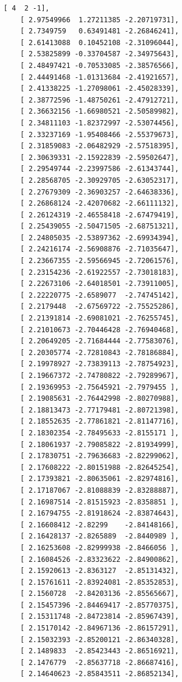 \documentclass[11pt]{article}
\begin{document}
    \begin{Verbatim}[commandchars=\\\{\}]
    [ 4  2 -1],
    [ 2.97549966  1.27211385 -2.20719731],
    [ 2.7349759   0.63491481 -2.26846241],
    [ 2.61413088  0.10452108 -2.31096044],
    [ 2.53825899 -0.33704587 -2.34975643],
    [ 2.48497421 -0.70533085 -2.38576566],
    [ 2.44491468 -1.01313684 -2.41921657],
    [ 2.41338225 -1.27098061 -2.45028339],
    [ 2.38772596 -1.48750261 -2.47912721],
    [ 2.36632156 -1.66980521 -2.50589982],
    [ 2.34811103 -1.82372997 -2.53074456],
    [ 2.33237169 -1.95408466 -2.55379673],
    [ 2.31859083 -2.06482929 -2.57518395],
    [ 2.30639331 -2.15922839 -2.59502647],
    [ 2.29549744 -2.23997586 -2.61343744],
    [ 2.28568705 -2.30929705 -2.63052317],
    [ 2.27679309 -2.36903257 -2.64638336],
    [ 2.26868124 -2.42070682 -2.66111132],
    [ 2.26124319 -2.46558418 -2.67479419],
    [ 2.25439055 -2.50471505 -2.68751321],
    [ 2.24805035 -2.53897362 -2.69934394],
    [ 2.24216174 -2.56908876 -2.71035647],
    [ 2.23667355 -2.59566945 -2.72061576],
    [ 2.23154236 -2.61922557 -2.73018183],
    [ 2.22673106 -2.64018501 -2.73911005],
    [ 2.22220775 -2.6589077  -2.74745142],
    [ 2.2179448  -2.67569722 -2.75525286],
    [ 2.21391814 -2.69081021 -2.76255745],
    [ 2.21010673 -2.70446428 -2.76940468],
    [ 2.20649205 -2.71684444 -2.77583076],
    [ 2.20305774 -2.72810843 -2.78186884],
    [ 2.19978927 -2.73839113 -2.78754923],
    [ 2.19667372 -2.74780822 -2.79289967],
    [ 2.19369953 -2.75645921 -2.7979455 ],
    [ 2.19085631 -2.76442998 -2.80270988],
    [ 2.18813473 -2.77179481 -2.80721398],
    [ 2.18552635 -2.77861821 -2.81147716],
    [ 2.18302354 -2.78495633 -2.8155171 ],
    [ 2.18061937 -2.79085822 -2.81934999],
    [ 2.17830751 -2.79636683 -2.82299062],
    [ 2.17608222 -2.80151988 -2.82645254],
    [ 2.17393821 -2.80635061 -2.82974816],
    [ 2.17187067 -2.81088839 -2.83288887],
    [ 2.16987514 -2.81515923 -2.8358851 ],
    [ 2.16794755 -2.81918624 -2.83874643],
    [ 2.16608412 -2.82299    -2.84148166],
    [ 2.16428137 -2.8265889  -2.8440989 ],
    [ 2.16253608 -2.82999938 -2.8466056 ],
    [ 2.16084526 -2.83323622 -2.84900862],
    [ 2.15920613 -2.8363127  -2.85131432],
    [ 2.15761611 -2.83924081 -2.85352853],
    [ 2.1560728  -2.84203136 -2.85565667],
    [ 2.15457396 -2.84469417 -2.85770375],
    [ 2.15311748 -2.84723814 -2.85967439],
    [ 2.15170142 -2.84967136 -2.86157291],
    [ 2.15032393 -2.85200121 -2.86340328],
    [ 2.1489833  -2.85423443 -2.86516921],
    [ 2.1476779  -2.85637718 -2.86687416],
    [ 2.14640623 -2.85843511 -2.86852134],

\end{Verbatim}
\end{document}
